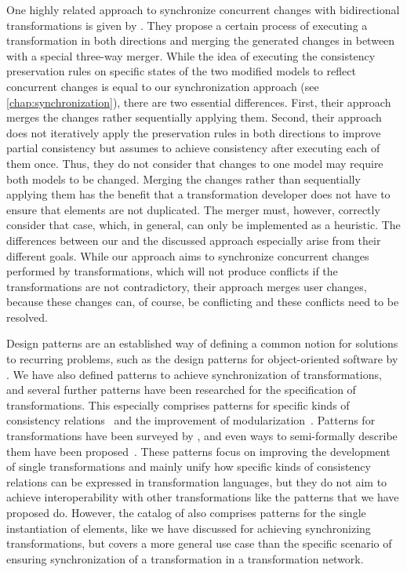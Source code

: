 One highly related approach to synchronize concurrent changes with bidirectional transformations is given by \textcite{xiong2009parallelUpdates-ICMT,xiong2013SynchronizingConcurrentUpdates-SoSym}.
They propose a certain process of executing a transformation in both directions and merging the generated changes in between with a special three-way merger.
While the idea of executing the consistency preservation rules on specific states of the two modified models to reflect concurrent changes is equal to our synchronization approach (see \autoref{chap:synchronization}), there are two essential differences.
First, their approach merges the changes rather sequentially applying them.
Second, their approach does not iteratively apply the preservation rules in both directions to improve partial consistency but assumes to achieve consistency after executing each of them once. Thus, they do not consider that changes to one model may require both models to be changed.
Merging the changes rather than sequentially applying them has the benefit that a transformation developer does not have to ensure that elements are not duplicated. The merger must, however, correctly consider that case, which, in general, can only be implemented as a heuristic.
The differences between our and the discussed approach especially arise from their different goals. 
While our approach aims to synchronize concurrent changes performed by transformations, which will not produce conflicts if the transformations are not contradictory, their approach merges user changes, because these changes can, of course, be conflicting and these conflicts need to be resolved.

Design patterns are an established way of defining a common notion for solutions to recurring problems, such as the design patterns for object-oriented software by \textcite{gamma1995designPatterns-Book}.
We have also defined patterns to achieve synchronization of transformations, and several further patterns have been researched for the specification of transformations.
This especially comprises patterns for specific kinds of consistency relations~\cite{iacob2008a} and the improvement of modularization~\cite{lano2014a}.
Patterns for transformations have been surveyed by \textcite{lano2018a}, and even ways to semi-formally describe them have been proposed~\cite{ergin2016patternsTransformations-CLSS}.
These patterns focus on improving the development of single transformations and mainly unify how specific kinds of consistency relations can be expressed in transformation languages, but they do not aim to achieve interoperability with other transformations like the patterns that we have proposed do.
However, the catalog of \textcite{lano2014a} also comprises patterns for the single instantiation of elements, like we have discussed for achieving synchronizing transformations, but covers a more general use case than the specific scenario of ensuring synchronization of a transformation in a transformation network.


